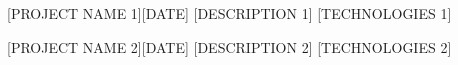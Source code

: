 %
%
%


\begin{projects}
        \project
        {[PROJECT NAME 1]}{[DATE]}
        {\website{[URL 1]}{[URL 1]} }
        {[DESCRIPTION 1]}
        {[TECHNOLOGIES 1]}

        \project
        {[PROJECT NAME 2]}{[DATE]}
        { \website{[URL 2]}{[URL 2]}}
        {[DESCRIPTION 2]}
        {[TECHNOLOGIES 2]}

\end{projects}
